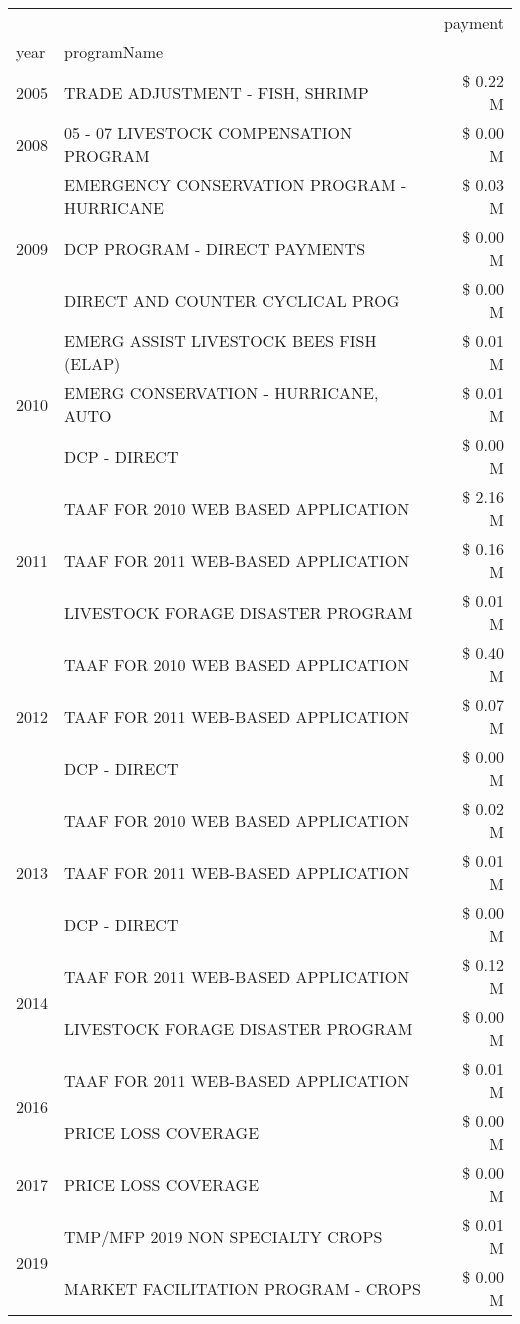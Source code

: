 \begin{tabular}{llr}
\toprule
 &  & payment \\
year & programName &  \\
\midrule
2005 & TRADE ADJUSTMENT - FISH, SHRIMP & \$ 0.22 M \\
\cline{1-3}
2008 & 05 - 07 LIVESTOCK COMPENSATION PROGRAM & \$ 0.00 M \\
\cline{1-3}
\multirow[t]{3}{*}{2009} & EMERGENCY CONSERVATION PROGRAM - HURRICANE & \$ 0.03 M \\
 & DCP PROGRAM - DIRECT PAYMENTS & \$ 0.00 M \\
 & DIRECT AND COUNTER CYCLICAL PROG & \$ 0.00 M \\
\cline{1-3}
\multirow[t]{3}{*}{2010} & EMERG ASSIST LIVESTOCK BEES FISH (ELAP) & \$ 0.01 M \\
 & EMERG CONSERVATION - HURRICANE, AUTO & \$ 0.01 M \\
 & DCP - DIRECT & \$ 0.00 M \\
\cline{1-3}
\multirow[t]{3}{*}{2011} & TAAF FOR 2010 WEB BASED APPLICATION & \$ 2.16 M \\
 & TAAF FOR 2011 WEB-BASED APPLICATION & \$ 0.16 M \\
 & LIVESTOCK FORAGE DISASTER PROGRAM & \$ 0.01 M \\
\cline{1-3}
\multirow[t]{3}{*}{2012} & TAAF FOR 2010 WEB BASED APPLICATION & \$ 0.40 M \\
 & TAAF FOR 2011 WEB-BASED APPLICATION & \$ 0.07 M \\
 & DCP - DIRECT & \$ 0.00 M \\
\cline{1-3}
\multirow[t]{3}{*}{2013} & TAAF FOR 2010 WEB BASED APPLICATION & \$ 0.02 M \\
 & TAAF FOR 2011 WEB-BASED APPLICATION & \$ 0.01 M \\
 & DCP - DIRECT & \$ 0.00 M \\
\cline{1-3}
\multirow[t]{2}{*}{2014} & TAAF FOR 2011 WEB-BASED APPLICATION & \$ 0.12 M \\
 & LIVESTOCK FORAGE DISASTER PROGRAM & \$ 0.00 M \\
\cline{1-3}
\multirow[t]{2}{*}{2016} & TAAF FOR 2011 WEB-BASED APPLICATION & \$ 0.01 M \\
 & PRICE LOSS COVERAGE & \$ 0.00 M \\
\cline{1-3}
2017 & PRICE LOSS COVERAGE & \$ 0.00 M \\
\cline{1-3}
\multirow[t]{2}{*}{2019} & TMP/MFP 2019 NON SPECIALTY CROPS & \$ 0.01 M \\
 & MARKET FACILITATION PROGRAM - CROPS & \$ 0.00 M \\

\end{tabular}
